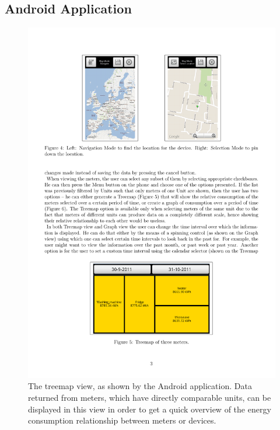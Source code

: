 \documentclass[10pt, conference, compsocconf]{IEEEtran}
\begin{document}
\subsection{Android Application}

\begin{figure}[t]
\begin{centering}
\includegraphics[scale=0.78]{images/mobile-treemap} 
\par\end{centering}

\caption{The treemap view, as shown by the Android application. Data returned
from meters, which have directly comparable units, can be displayed
in this view in order to get a quick overview of the energy consumption
relationship between meters or devices.\label{fig:treemap-android}}
\end{figure}
\end{document}
